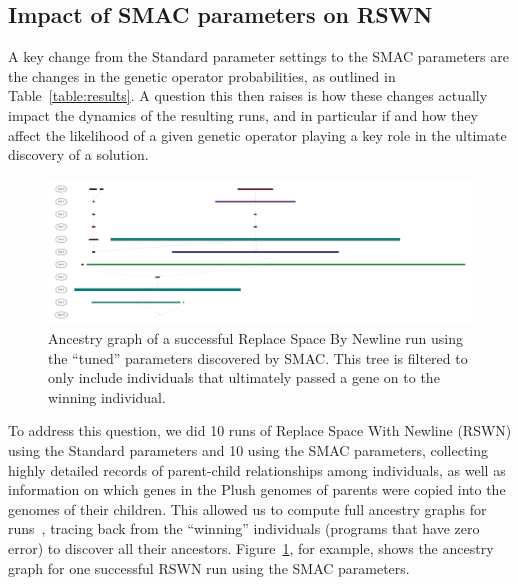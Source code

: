 \subsection{Impact of SMAC parameters on RSWN}
\label{sec:SMACimpactRSWN}


A key change from the Standard parameter settings to the SMAC parameters
are the changes in the genetic operator probabilities, as outlined in
Table~\ref{table:results}. A question this then raises is how these changes
actually impact the dynamics of the resulting runs, and in particular if and
how they affect the likelihood of a given genetic operator playing a key
role in the ultimate discovery of a solution.

\begin{figure}
	\includegraphics[width=6in]{../figures/log1_filter_by_genes_vanilla}
	\caption{Ancestry graph of a successful Replace Space By Newline run
	using the ``tuned'' parameters discovered by SMAC. This tree is filtered 
	to only include individuals that ultimately passed a gene
	on to the winning individual.}
	\label{fig:log1ByGenes}
\end{figure}

To address this question, we did 10 runs of Replace Space With Newline (RSWN) 
using the Standard parameters and 10 using the SMAC parameters, 
collecting highly detailed records of parent-child relationships 
among individuals, as well as information on which genes in the Plush 
genomes of parents were copied into
the genomes of their children. This allowed us to compute full ancestry
graphs for 
runs~\cite{McPhee:2016:VGP:2908961.2931741,McPhee:2015:GPTP,McPhee:2016:GPTP},
tracing back from the ``winning'' individuals (programs that have zero error)
to discover all their ancestors. Figure~\ref{fig:log1ByGenes}, for example,
shows the ancestry graph for one successful RSWN run using the SMAC parameters.

